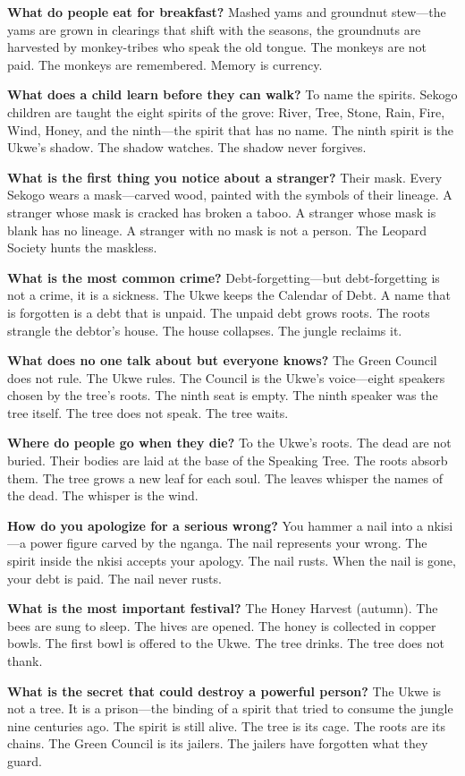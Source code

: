 \vspace{1em}

\begin{almanac}
\textbf{What do people eat for breakfast?} Mashed yams and groundnut stew---the yams are grown in clearings that shift with the seasons, the groundnuts are harvested by monkey-tribes who speak the old tongue. The monkeys are not paid. The monkeys are remembered. Memory is currency.

\textbf{What does a child learn before they can walk?} To name the spirits. Sekogo children are taught the eight spirits of the grove: River, Tree, Stone, Rain, Fire, Wind, Honey, and the ninth---the spirit that has no name. The ninth spirit is the Ukwe's shadow. The shadow watches. The shadow never forgives.

\textbf{What is the first thing you notice about a stranger?} Their mask. Every Sekogo wears a mask---carved wood, painted with the symbols of their lineage. A stranger whose mask is cracked has broken a taboo. A stranger whose mask is blank has no lineage. A stranger with no mask is not a person. The Leopard Society hunts the maskless.

\textbf{What is the most common crime?} Debt-forgetting---but debt-forgetting is not a crime, it is a sickness. The Ukwe keeps the Calendar of Debt. A name that is forgotten is a debt that is unpaid. The unpaid debt grows roots. The roots strangle the debtor's house. The house collapses. The jungle reclaims it.

\textbf{What does no one talk about but everyone knows?} The Green Council does not rule. The Ukwe rules. The Council is the Ukwe's voice---eight speakers chosen by the tree's roots. The ninth seat is empty. The ninth speaker was the tree itself. The tree does not speak. The tree waits.

\textbf{Where do people go when they die?} To the Ukwe's roots. The dead are not buried. Their bodies are laid at the base of the Speaking Tree. The roots absorb them. The tree grows a new leaf for each soul. The leaves whisper the names of the dead. The whisper is the wind.

\textbf{How do you apologize for a serious wrong?} You hammer a nail into a nkisi---a power figure carved by the nganga. The nail represents your wrong. The spirit inside the nkisi accepts your apology. The nail rusts. When the nail is gone, your debt is paid. The nail never rusts.

\textbf{What is the most important festival?} The Honey Harvest (autumn). The bees are sung to sleep. The hives are opened. The honey is collected in copper bowls. The first bowl is offered to the Ukwe. The tree drinks. The tree does not thank.

\textbf{What is the secret that could destroy a powerful person?} The Ukwe is not a tree. It is a prison---the binding of a spirit that tried to consume the jungle nine centuries ago. The spirit is still alive. The tree is its cage. The roots are its chains. The Green Council is its jailers. The jailers have forgotten what they guard.
\end{almanac}


